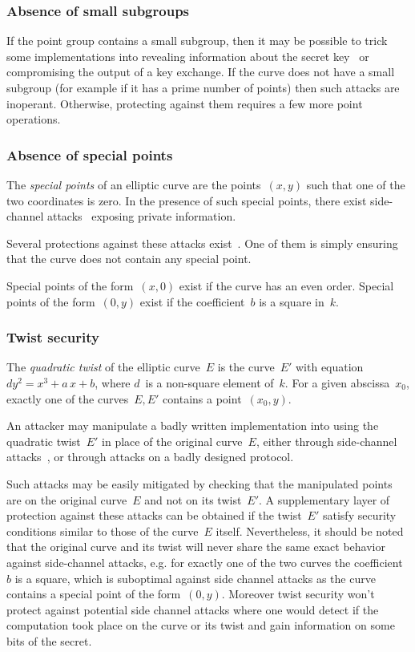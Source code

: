 \documentclass[twocolumn,letterpaper,10pt]{article}
\begin{document}
\subsubsection{Absence of small subgroups}
\label{sss:small-subgroup}

If the point group contains a small subgroup,
then it may be possible to trick some implementations
into revealing information about the secret key~\cite{crypto1997ll}
or compromising the output of a key exchange.
If the curve does not have a small subgroup
(for example if it has a prime number of points)
then such attacks are inoperant.
Otherwise, protecting against them requires a few more point operations.

\subsubsection{Absence of special points}
\label{sss:special-points}

The \emph{special points} of an elliptic curve
are the points~$(x,y)$ such that one of the two coordinates is zero.
In the presence of such special points,
there exist side-channel attacks~\cite{pkc2003goubin}
exposing private information.

Several protections against these attacks exist~\cite{ches2004mmm}.
One of them is simply ensuring that the curve does not contain
any special point.

Special points of the form~$(x, 0)$ exist if the curve has
an even order.
Special points of the form~$(0, y)$ exist if the coefficient~$b$
is a square in~$k$.

\subsubsection{Twist security}
\label{sss:twist}

The \emph{quadratic twist} of the elliptic curve~$E$
is the curve~$E'$ with equation~$d y^2 = x^3 + a\,x + b$,
where $d$~is a non-square element of~$k$.
For a given abscissa~$x_0$,
exactly one of the curves~$E, E'$ contains a point~$(x_0, y)$.

An attacker may manipulate a badly written implementation
into using the quadratic twist~$E'$
in place of the original curve~$E$,
either through side-channel attacks~\cite{fdtc2008flrv},
or through attacks on a badly designed protocol.

Such attacks may be easily mitigated by checking
that the manipulated points are on the original curve~$E$
and not on its twist~$E'$.
A supplementary layer of protection against these attacks
can be obtained if the twist~$E'$ satisfy
security conditions similar to those of the curve~$E$ itself.
Nevertheless, it should be noted that the original curve and
its twist will never share the same exact behavior against
side-channel attacks, e.g. for exactly one of the two curves the coefficient $b$
is a square, which is suboptimal against side channel attacks
as the curve contains a special point of the form~$(0, y)$.
Moreover twist security won't protect against potential side channel attacks
where one would detect if the computation took place on the curve or its twist
and gain information on some bits of the secret.
\end{document}
